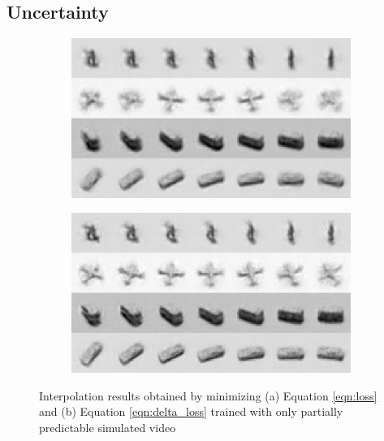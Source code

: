 \documentclass{article} %
\begin{document}
\subsection{Uncertainty}
\begin{figure}
  \centering
   \begin{subfigure}[b]{0.45\textwidth}
        \includegraphics[width=\textwidth]{./figures/taco/interp_nodelta.png}
        \caption{}
        \label{fig:noDelta}
    \end{subfigure} 
  \begin{subfigure}[b]{0.45\textwidth}
        \includegraphics[width=\textwidth]{./figures/taco/interp_delta.png}
        \caption{}
    \end{subfigure} 
    \label{fig:withDelta}
  \caption{Interpolation results obtained by minimizing (a) Equation \ref{eqn:loss} and (b) Equation \ref{eqn:delta_loss} trained with only partially predictable simulated video} 
  \label{fig:delta}
\end{figure} 
\end{document}
